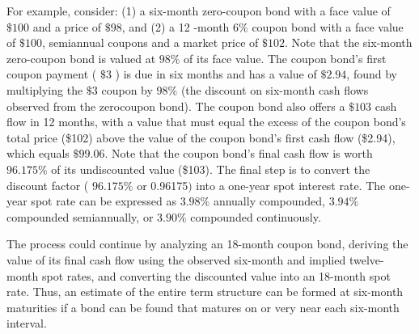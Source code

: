 \documentclass[11pt]{article}
\begin{document}
For example, consider: (1) a six-month zero-coupon bond with a face value of $\$ 100$ and a price of $\$ 98$, and (2) a 12 -month $6 \%$ coupon bond with a face value of $\$ 100$, semiannual coupons and a market price of $\$ 102$. Note that the six-month zero-coupon bond is valued at $98 \%$ of its face value. The coupon bond's first coupon payment ( $\$ 3$ ) is due in six months and has a value of $\$ 2.94$, found by multiplying the $\$ 3$ coupon by $98 \%$ (the discount on six-month cash flows observed from the zerocoupon bond). The coupon bond also offers a $\$ 103$ cash flow in 12 months, with a value that must equal the excess of the coupon bond's total price (\$102) above the value of the coupon bond's first cash flow (\$2.94), which equals $\$ 99.06$. Note that the coupon bond's final cash flow is worth $96.175 \%$ of its undiscounted value (\$103). The final step is to convert the discount factor ( $96.175 \%$ or 0.96175$)$ into a one-year spot interest rate. The one-year spot rate can be expressed as $3.98 \%$ annually compounded, $3.94 \%$ compounded semiannually, or $3.90 \%$ compounded continuously.

The process could continue by analyzing an 18-month coupon bond, deriving the value of its final cash flow using the observed six-month and implied twelve-month spot rates, and converting the discounted value into an 18-month spot rate. Thus, an estimate of the entire term structure can be formed at six-month maturities if a bond can be found that matures on or very near each six-month interval.
\end{document}
